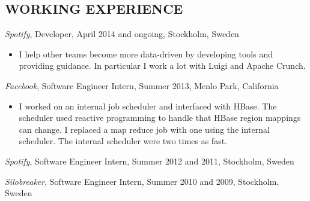 \documentclass[11pt]{res} %
\begin{document}
\begin{resume}
\section{WORKING EXPERIENCE}
\emph{Spotify}, {\footnotesize Developer, April 2014 and ongoing}, Stockholm, Sweden
\vspace{0.2in}
   \begin{itemize}
     \item I help other teams become more data-driven by developing tools and
     providing guidance.  In particular I work a lot with Luigi and Apache
     Crunch.
 \end{itemize}

 \emph{Facebook}, {\footnotesize Software Engineer Intern, Summer 2013}, Menlo Park, California
\vspace{0.2in}
   \begin{itemize}
   \item I worked on an internal job scheduler and interfaced with HBase. The
     scheduler used reactive programming to handle that HBase region mappings
     can change. I replaced a map reduce job with one using the internal
     scheduler. The internal scheduler were two times as fast.
 \end{itemize}

 \emph{Spotify}, {\footnotesize Software Engineer Intern, Summer 2012 and 2011}, Stockholm, Sweden


 \emph{Silobreaker}, {\footnotesize Software Engineer Intern, Summer 2010 and 2009}, Stockholm, Sweden


\end{resume}
\end{document}
